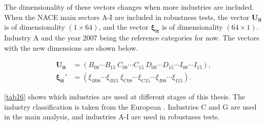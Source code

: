 \documentclass[10pt,twocolumn,oneside,cmyk]{article}
\begin{document}
The dimensionality of these vectors changes when more industries are included. When the NACE main sectors A-I are included in robustness tests, the vector $\bm{U_{it}}$ is of dimensionality $(1\times64)$, and the vector $\bm{\xi_{it}}$ is of dimensionality $(64\times1)$. Industry A and the year 2007 being the reference categories for now. The vectors with the new dimensions are shown below.

\begin{equation}
 \begin{split}
  \bm{U_{it}} &=(B_{08} \cdots B_{15}\ C_{08} \cdots C_{15}\  D_{08} \cdots D_{15} \cdots I_{08} \cdots I_{15})\text{,}\\
  \bm{\xi_{it}'} &= (\xi_{B08}\cdots \xi_{B15}\ \xi_{C08}\cdots \xi_{C15}\cdots \xi_{I08}\cdots \xi_{I15})\text{.}
 \end{split}
\end{equation}

\cref{tab16} shows which industries are used at different stages of this thesis. The industry classification is taken from the European \textcite[57]{european_commission_nace_2008}. Industries C and G are used in the main analysis, and industries A-I are used in robustness tests.
\end{document}
